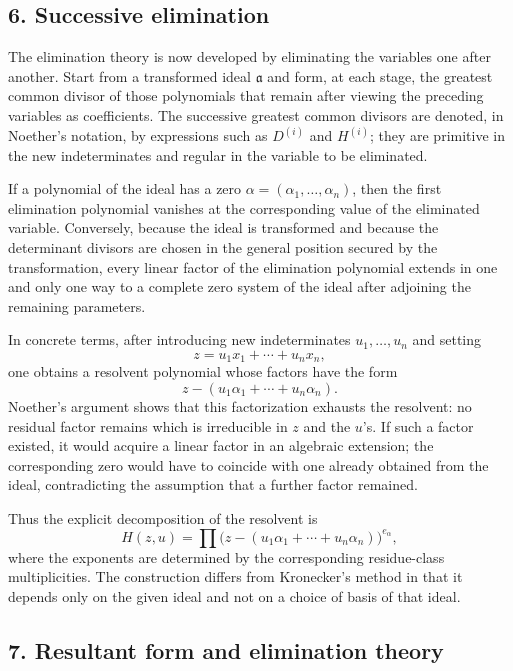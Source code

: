 \documentclass[11pt]{article}
\begin{document}
\subsection{6. Successive elimination}

The elimination theory is now developed by eliminating the variables one after another. Start from a transformed ideal $\mathfrak a$ and form, at each stage, the greatest common divisor of those polynomials that remain after viewing the preceding variables as coefficients. The successive greatest common divisors are denoted, in Noether's notation, by expressions such as $D^{(i)}$ and $H^{(i)}$; they are primitive in the new indeterminates and regular in the variable to be eliminated.

If a polynomial of the ideal has a zero $\alpha=(\alpha_1,\ldots,\alpha_n)$, then the first elimination polynomial vanishes at the corresponding value of the eliminated variable. Conversely, because the ideal is transformed and because the determinant divisors are chosen in the general position secured by the transformation, every linear factor of the elimination polynomial extends in one and only one way to a complete zero system of the ideal after adjoining the remaining parameters.

In concrete terms, after introducing new indeterminates $u_1,\ldots,u_n$ and setting
\[
  z=u_1x_1+\cdots+u_nx_n,
\]
one obtains a resolvent polynomial whose factors have the form
\[
  z-(u_1\alpha_1+
\cdots+u_n\alpha_n).
\]
Noether's argument shows that this factorization exhausts the resolvent: no residual factor remains which is irreducible in $z$ and the $u$'s. If such a factor existed, it would acquire a linear factor in an algebraic extension; the corresponding zero would have to coincide with one already obtained from the ideal, contradicting the assumption that a further factor remained.

Thus the explicit decomposition of the resolvent is
\begin{equation}
  H(z,u)=\prod\bigl(z-(u_1\alpha_1+
\cdots+u_n\alpha_n)\bigr)^{e_\alpha},        \tag{36}
\end{equation}
where the exponents are determined by the corresponding residue-class multiplicities. The construction differs from Kronecker's method in that it depends only on the given ideal and not on a choice of basis of that ideal.

\subsection{7. Resultant form and elimination theory}
\end{document}
